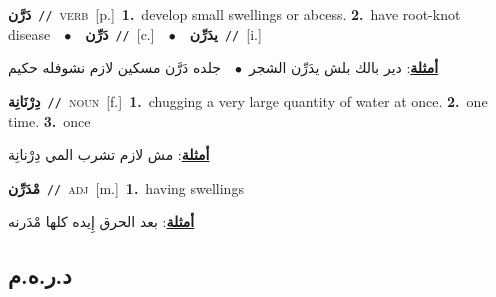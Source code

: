 \documentclass[10pt,a4paper,twoside]{article} %
\begin{document}
\begin{multicols}{2}
{\setlength\topsep{0pt}\textbf{\foreignlanguage{arabic}{دَرَّن}}\ {\color{gray}\texttt{//}\color{black}}\ \textsc{verb}\ [p.]\ \textbf{1.}~develop small swellings or abcess.  \textbf{2.}~have root-knot disease\ \ $\bullet$\ \ \setlength\topsep{0pt}\textbf{\foreignlanguage{arabic}{دَرِّن}}\ {\color{gray}\texttt{//}\color{black}}\ [c.]\ \ $\bullet$\ \ \setlength\topsep{0pt}\textbf{\foreignlanguage{arabic}{يدَرِّن}}\ {\color{gray}\texttt{//}\color{black}}\ [i.]\  \begin{flushright}\color{gray}\foreignlanguage{arabic}{\textbf{\underline{\foreignlanguage{arabic}{أمثلة}}}: دير بالك بلش يدَرِّن الشجر\ $\bullet$\ \  جلده دَرَّن مسكين لازم نشوفله حكيم}\end{flushright}\color{black}} \vspace{2mm}

{\setlength\topsep{0pt}\textbf{\foreignlanguage{arabic}{دِرْنَانِة}}\ {\color{gray}\texttt{//}\color{black}}\ \textsc{noun}\ [f.]\ \textbf{1.}~chugging a very large quantity of water at once.  \textbf{2.}~one time.  \textbf{3.}~once\  \begin{flushright}\color{gray}\foreignlanguage{arabic}{\textbf{\underline{\foreignlanguage{arabic}{أمثلة}}}: مش لازم تشرب المي دِرْنانِة}\end{flushright}\color{black}} \vspace{2mm}

{\setlength\topsep{0pt}\textbf{\foreignlanguage{arabic}{مْدَرِّن}}\ {\color{gray}\texttt{//}\color{black}}\ \textsc{adj}\ [m.]\ \textbf{1.}~having swellings\  \begin{flushright}\color{gray}\foreignlanguage{arabic}{\textbf{\underline{\foreignlanguage{arabic}{أمثلة}}}: بعد الحرق إِيده كلها مْدَرنه}\end{flushright}\color{black}} \vspace{2mm}

\vspace{-3mm}
\subsection*{\color{blue}\foreignlanguage{arabic}{د.ر.ه.م}\color{blue}{}} 


\end{multicols}
\end{document}
